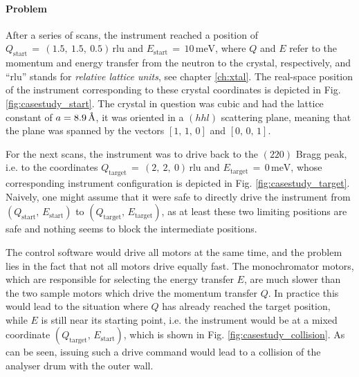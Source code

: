 \paragraph{Problem}
After a series of scans, the instrument reached a position of 
$Q_\mathrm{start}\,=\,\left(1.5,\ 1.5,\ 0.5\right)\, \mathrm{rlu}$ and  $E_\mathrm{start}\,=\,10\, \mathrm{meV}$, where
$Q$ and $E$ refer to the momentum and energy transfer from the neutron to the crystal, respectively,
and ``rlu'' stands for \textit{relative lattice units}, see chapter \ref{ch:xtal}. 
The real-space position of the instrument corresponding to these crystal coordinates is depicted in Fig. \ref{fig:casestudy_start}.
The crystal in question was cubic and had the lattice constant of $a = 8.9\,\textup{\AA}$, it was
oriented in a $(hhl)$ scattering plane, meaning that the plane was spanned by the vectors
$\left[1,\, 1,\, 0\right]$ and $\left[0,\, 0,\, 1\right]$.

For the next scans, the instrument was to drive back to the $\left(220\right)$ Bragg peak, 
i.e. to the coordinates $Q_\mathrm{target}\,=\,\left(2,\ 2,\ 0\right)\, \mathrm{rlu}$ and  $E_\mathrm{target}\,=\,0\, \mathrm{meV}$,
whose corresponding instrument configuration is depicted in Fig. \ref{fig:casestudy_target}.
Naively, one might assume that it were safe to directly drive the instrument from $\left(Q_\mathrm{start},\, E_\mathrm{start}\right)$
to $\left(Q_\mathrm{target},\, E_\mathrm{target}\right)$, as at least these two limiting positions are safe and nothing seems to block
the intermediate positions.

The control software would drive all motors at the same time, and the problem lies in the fact that not all motors
drive equally fast. The monochromator motors, which are responsible for selecting the energy transfer $E$, are
much slower than the two sample motors which drive the momentum transfer $Q$. In practice this would lead to
the situation where $Q$ has already reached the target position, while $E$ is still near its starting point, i.e. the instrument
would be at a mixed coordinate $\left(Q_\mathrm{target},\, E_\mathrm{start}\right)$,
which is shown in Fig. \ref{fig:casestudy_collision}.
As can be seen, issuing such a drive command would lead to a collision of the analyser drum with the outer wall.

